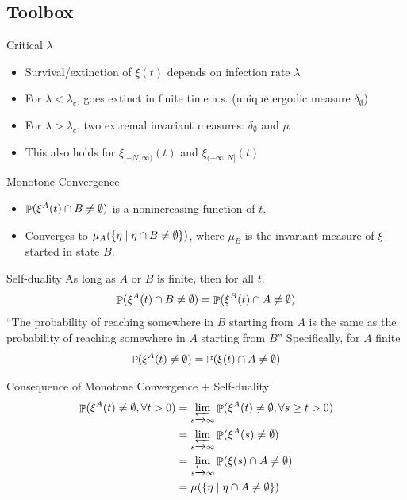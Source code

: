 \documentclass{beamer}
\begin{document}
\subsection{Toolbox}

\begin{frame}{Critical $\lambda$}
  \begin{itemize}
    \item Survival/extinction of $\xi(t)$ depends on infection rate $\lambda$
          \pause
    \item For $\lambda < \lambda_{c}$, goes extinct in finite time a.s. (unique ergodic measure $\delta_{\emptyset}$)
          \pause
    \item For $\lambda > \lambda_{c}$, two extremal invariant measures: $\delta_{\emptyset}$ and $\mu$
          \pause
    \item This also holds for $\xi_{[-N,\infty)}(t)$ and $\xi_{(-\infty,N]}(t)$
  \end{itemize}
\end{frame}

\begin{frame}{Monotone Convergence}
  \begin{itemize}
    \item $\mathop{\mathbb{P}}(\xi^{A}(t) \cap B \neq \emptyset)$ is a nonincreasing function of $t$.
      \pause
    \item Converges to $\mu_{A}(\{\eta \mid \eta \cap B \neq \emptyset\})$, where $\mu_{B}$ is the invariant measure of $\xi$ started in state $B$.
  \end{itemize}
\end{frame}

\begin{frame}{Self-duality}
  As long as $A$ or $B$ is finite, then for all $t$.
  \begin{equation}
    \mathop{\mathbb{P}}(\xi^{A}(t) \cap B \neq \emptyset) = \mathop{\mathbb{P}}(\xi^{B}(t) \cap A \neq \emptyset)
  \end{equation}
  \pause
  ``The probability of reaching somewhere in $B$ starting from $A$ is the same as the probability of reaching somewhere in $A$ starting from $B$''
  \pause
  Specifically, for $A$ finite
  \begin{equation}
    \mathop{\mathbb{P}}(\xi^{A}(t) \neq \emptyset) = \mathop{\mathbb{P}}(\xi(t) \cap A \neq \emptyset)
  \end{equation}
\end{frame}

\begin{frame}{Consequence of Monotone Convergence + Self-duality}
  \begin{align*}
    \Prob(\xi^{A}(t) \neq \emptyset, \forall t > 0) &= \limas_{s \to \infty} \Prob(\xi^{A}(t) \neq \emptyset, \forall s \geq t > 0) \\
                                 &= \limas_{s \to \infty} \Prob(\xi^{A}(s) \neq \emptyset) \\
                                 &= \limas_{s \to \infty} \Prob(\xi(s) \cap A \neq \emptyset) \\
                                 &= \mu(\set{\eta \st \eta \cap A \neq \emptyset})
  \end{align*}
\end{frame}
\end{document}

